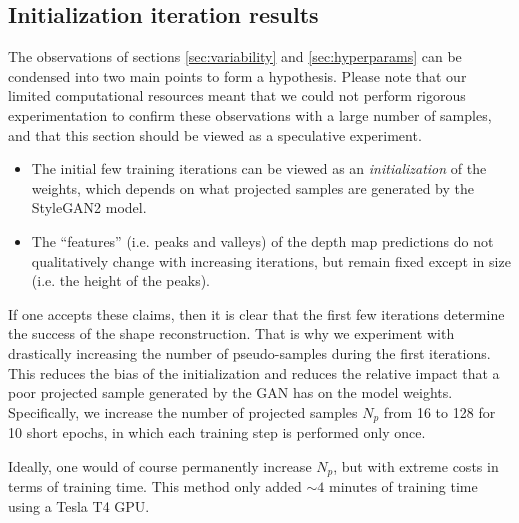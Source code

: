 \newpage

\subsection{Initialization iteration results}
\label{sec:appendix-init_inter}
 The observations of sections \ref{sec:variability} and \ref{sec:hyperparams} can be condensed into two main points to form a hypothesis. Please note that our limited computational resources meant that we could not perform rigorous experimentation to confirm these observations with a large number of samples, and that this section should be viewed as a speculative experiment.

\begin{itemize}
    \item The initial few training iterations can be viewed as an \textit{initialization} of the weights, which depends on what projected samples are generated by the StyleGAN2 model.
    
    \item The ``features'' (i.e. peaks and valleys) of the depth map predictions do not qualitatively change with increasing iterations, but remain fixed except in size (i.e. the height of the peaks).
\end{itemize}

If one accepts these claims, then it is clear that the first few iterations determine the success of the shape reconstruction. That is why we experiment with drastically increasing the number of pseudo-samples during the first iterations. This reduces the bias of the initialization and reduces the relative impact that a poor projected sample generated by the GAN has on the model weights. Specifically, we increase the number of projected samples $N_{p}$ from 16 to 128 for 10 short epochs, in which each training step is performed only once. 

Ideally, one would of course permanently increase $N_{p}$, but with extreme costs in terms of training time. This method only added $\sim4$ minutes of training time using a Tesla T4 GPU.


